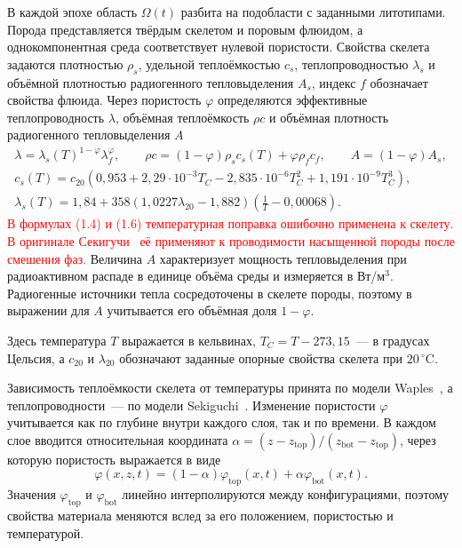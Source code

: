 В каждой эпохе область $\Omega(t)$ разбита на подобласти с заданными литотипами. Порода представляется твёрдым скелетом и поровым флюидом, а однокомпонентная среда соответствует нулевой пористости. Свойства скелета задаются плотностью $\rho_s$, удельной теплоёмкостью $c_s$, теплопроводностью $\lambda_s$ и объёмной плотностью радиогенного тепловыделения $A_s$, индекс $f$ обозначает свойства флюида. Через пористость $\varphi$ определяются эффективные теплопроводность $\lambda$, объёмная теплоёмкость $\rho c$ и объёмная плотность радиогенного тепловыделения $A$
\begin{gather}
 \lambda = \lambda_s(T)^{1 - \varphi}\lambda_f^{\varphi},\qquad
 \rho c = (1 - \varphi)\rho_s c_s(T) + \varphi\rho_f c_f,\qquad
 A = (1 - \varphi)A_s,\\
 c_s(T) = c_{20}\left(0{,}953 + 2{,}29 \cdot 10^{-3} T_C
              - 2{,}835 \cdot 10^{-6} T_C^2 + 1{,}191 \cdot 10^{-9} T_C^3\right),\\
 \lambda_s(T) = 1{,}84 + 358(1{,}0227\lambda_{20} - 1{,}882)
                            \left(\frac{1}{T} - 0{,}00068\right).
\end{gather}
\textcolor{red}{В формулах (1.4) и (1.6) температурная поправка ошибочно применена к скелету. В оригинале Секигучи~\cite{sekiguchi1984} её применяют к проводимости насыщенной породы после смешения фаз.}
Величина $A$ характеризует мощность тепловыделения при радиоактивном распаде в единице объёма среды и измеряется в Вт/м$^3$. Радиогенные источники тепла сосредоточены в скелете породы, поэтому в выражении для $A$ учитывается его объёмная доля $1-\varphi$.

Здесь температура $T$ выражается в кельвинах, $T_C=T-273{,}15$~--- в градусах Цельсия, а $c_{20}$ и $\lambda_{20}$ обозначают заданные опорные свойства скелета при $20\,{}^\circ$C.

Зависимость теплоёмкости скелета от температуры принята по модели Waples~\cite{waples2004}, а теплопроводности~--- по модели Sekiguchi~\cite{sekiguchi1984}. Изменение пористости $\varphi$ учитывается как по глубине внутри каждого слоя, так и по времени. В каждом слое вводится относительная координата $\alpha=(z-z_{\mathrm{top}})/(z_{\mathrm{bot}}-z_{\mathrm{top}})$, через которую пористость выражается в виде
\begin{equation}
 \varphi(x,z,t) = (1 - \alpha)\varphi_{\mathrm{top}}(x,t)
                  + \alpha\varphi_{\mathrm{bot}}(x,t).
\end{equation}
Значения $\varphi_{\mathrm{top}}$ и $\varphi_{\mathrm{bot}}$ линейно интерполируются между конфигурациями, поэтому свойства материала меняются вслед за его положением, пористостью и температурой.

